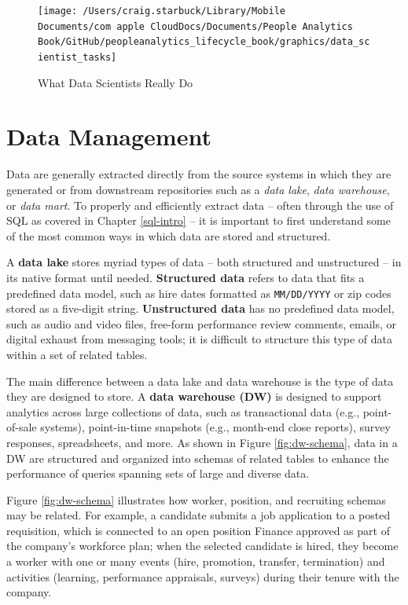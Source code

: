 \documentclass[
]{book}
\begin{document}
\begin{figure}

{\centering \texttt{[image: /Users/craig.starbuck/Library/Mobile Documents/com~apple~CloudDocs/Documents/People Analytics Book/GitHub/peopleanalytics\_lifecycle\_book/graphics/data\_scientist\_tasks]} 

}

\caption{What Data Scientists Really Do}\label{fig:ds-tasks}
\end{figure}

\hypertarget{data-management}{%
\section{Data Management}\label{data-management}}

Data are generally extracted directly from the source systems in which they are generated or from downstream repositories such as a \emph{data lake}, \emph{data warehouse}, or \emph{data mart}. To properly and efficiently extract data -- often through the use of SQL as covered in Chapter \ref{sql-intro} -- it is important to first understand some of the most common ways in which data are stored and structured.

A \textbf{data lake} stores myriad types of data -- both structured and unstructured -- in its native format until needed. \textbf{Structured data} refers to data that fits a predefined data model, such as hire dates formatted as \texttt{MM/DD/YYYY} or zip codes stored as a five-digit string. \textbf{Unstructured data} has no predefined data model, such as audio and video files, free-form performance review comments, emails, or digital exhaust from messaging tools; it is difficult to structure this type of data within a set of related tables.

The main difference between a data lake and data warehouse is the type of data they are designed to store. A \textbf{data warehouse (DW)} is designed to support analytics across large collections of data, such as transactional data (e.g., point-of-sale systems), point-in-time snapshots (e.g., month-end close reports), survey responses, spreadsheets, and more. As shown in Figure \ref{fig:dw-schema}, data in a DW are structured and organized into schemas of related tables to enhance the performance of queries spanning sets of large and diverse data.

Figure \ref{fig:dw-schema} illustrates how worker, position, and recruiting schemas may be related. For example, a candidate submits a job application to a posted requisition, which is connected to an open position Finance approved as part of the company's workforce plan; when the selected candidate is hired, they become a worker with one or many events (hire, promotion, transfer, termination) and activities (learning, performance appraisals, surveys) during their tenure with the company.
\end{document}
